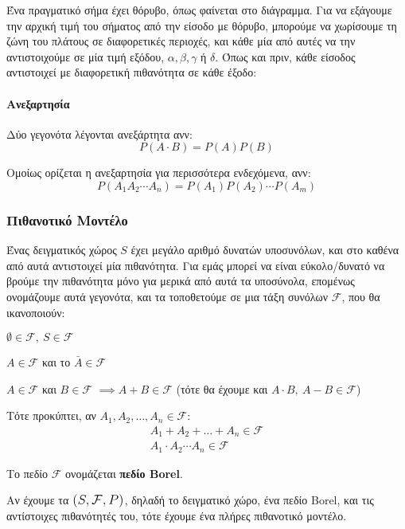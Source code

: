 \documentclass[11pt,a4paper,notitlepage,fleqn,final]{article}
\begin{document}
	Ένα πραγματικό σήμα έχει θόρυβο, όπως φαίνεται στο διάγραμμα. Για
	να εξάγουμε την αρχική τιμή του σήματος από την είσοδο με θόρυβο,
	μπορούμε να χωρίσουμε τη ζώνη του πλάτους σε διαφορετικές περιοχές,
	και κάθε μία από αυτές να την αντιστοιχούμε σε μία τιμή εξόδου,
	\( \alpha, \beta, \gamma \) ή \( \delta \). Όπως και πριν, κάθε
	είσοδος αντιστοιχεί με διαφορετική πιθανότητα σε κάθε έξοδο:
	
	\paragraph{Ανεξαρτησία}
	Δύο γεγονότα λέγονται ανεξάρτητα ανν:
	\[
	P(A\cdot B) = P(A)P(B)
	\]
	
	Ομοίως ορίζεται η ανεξαρτησία για περισσότερα ενδεχόμενα, ανν:
	\[
	P(A_1A_2\cdots A_n) = P(A_1)P(A_2)\cdots P(A_m)
	\]
	
	\subsubsection{Πιθανοτικό Μοντέλο}
	Ένας δειγματικός χώρος \( S \) έχει μεγάλο αριθμό δυνατών υποσυνόλων,
	και στο καθένα από αυτά αντιστοιχεί μία πιθανότητα. Για εμάς μπορεί
	να είναι εύκολο/δυνατό να βρούμε την πιθανότητα μόνο για μερικά
	από αυτά τα υποσύνολα, επομένως ονομάζουμε αυτά γεγονότα, και τα
	τοποθετούμε σε μια τάξη συνόλων \( \mathcal F \), που θα ικανοποιούν:
	
	\begin{enumroman}
		\item \( \emptyset \in \mathcal F,\
		S \in \mathcal{F}
		 \)
		\item \( A \in \mathcal F \) και το \( \bar A \in \mathcal F \)
		\item \( A \in \mathcal F \) και \( B \in \mathcal F \)
		\( \implies A + B \in \mathcal F \) \quad
		(τότε θα έχουμε και \( A\cdot B,\ A-B \in \mathcal F \))
	\end{enumroman}
	
	Τότε προκύπτει, αν \( A_1,A_2,\dots,A_n \in \mathcal F \):
	\begin{gather*}
		A_1+A_2+\dots +A_n \in \mathcal F \\
		A_1\cdot A_2 \cdots A_n \in \mathcal F
	\end{gather*}
	
	Το πεδίο \( \mathcal F \) ονομάζεται \textbf{πεδίο Borel}.
	
	Αν έχουμε τα \( \mathlarger{\mathlarger{(S,\mathcal F,P)}} \),
	δηλαδή το
	δειγματικό χώρο, ένα πεδίο Borel, και τις αντίστοιχες πιθανότητές
	του, τότε έχουμε ένα πλήρες πιθανοτικό μοντέλο.
	
\end{document}
